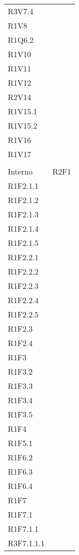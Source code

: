 \begin{longtable}{ >{\centering}p{}
			>{\centering}p{}}
R3V7.4\\
R1V8\\
R1Q6.2\\

R1V10\\
R1V11\\
R1V12\\
R2V14\\
R1V15.1\\
R1V15.2\\
R1V16\\
R1V17\\
	\tabularnewline
Interno	&	 R2F1\\
R1F2.1.1\\
R1F2.1.2\\
R1F2.1.3\\
R1F2.1.4\\
R1F2.1.5\\
R1F2.2.1\\
R1F2.2.2\\
R1F2.2.3\\
R1F2.2.4\\
R1F2.2.5\\
R1F2.3\\
R1F2.4\\
R1F3\\
R1F3.2\\
R1F3.3\\
R1F3.4\\
R1F3.5\\
R1F4\\
R1F5.1\\
R1F6.2\\
R1F6.3\\
R1F6.4\\
R1F7\\
R1F7.1\\
R1F7.1.1\\
R3F7.1.1.1 \\


\end{longtable}
